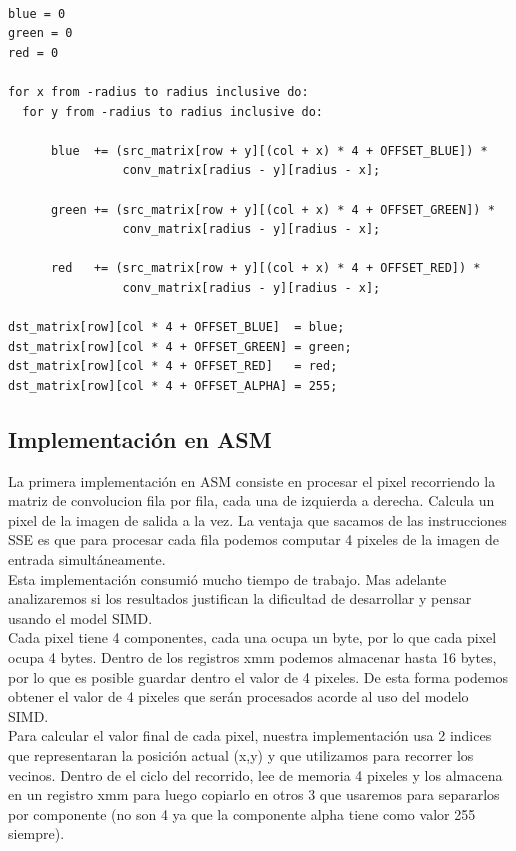 \documentclass[10pt,a4paper,spanish]{article}
\begin{document}
\begin{codesnippet}
\begin{verbatim}

blue = 0
green = 0
red = 0

for x from -radius to radius inclusive do:
  for y from -radius to radius inclusive do:

      blue  += (src_matrix[row + y][(col + x) * 4 + OFFSET_BLUE]) *
                conv_matrix[radius - y][radius - x];

      green += (src_matrix[row + y][(col + x) * 4 + OFFSET_GREEN]) *
                conv_matrix[radius - y][radius - x];

      red   += (src_matrix[row + y][(col + x) * 4 + OFFSET_RED]) *
                conv_matrix[radius - y][radius - x];

dst_matrix[row][col * 4 + OFFSET_BLUE]  = blue;
dst_matrix[row][col * 4 + OFFSET_GREEN] = green;
dst_matrix[row][col * 4 + OFFSET_RED]   = red;
dst_matrix[row][col * 4 + OFFSET_ALPHA] = 255;

\end{verbatim}
\end{codesnippet}

\subsection{Implementación en ASM}

La primera implementación en ASM consiste en procesar el pixel recorriendo la matriz de convolucion fila por fila, cada una de izquierda a derecha.
Calcula un pixel de la imagen de salida a la vez. La ventaja que sacamos de las instrucciones SSE es que para procesar cada fila podemos computar 4 pixeles de la imagen de entrada simultáneamente. \\

Esta implementación consumió mucho tiempo de trabajo. Mas adelante analizaremos si los resultados justifican la dificultad de desarrollar y pensar usando el model SIMD. \\

Cada pixel tiene 4 componentes, cada una ocupa un byte, por lo que cada pixel ocupa 4 bytes. Dentro de los registros xmm podemos almacenar hasta 16 bytes, por lo que es posible guardar dentro el valor de 4 pixeles. De esta forma podemos obtener el valor de 4 pixeles que serán procesados acorde al uso del modelo SIMD. \\

Para calcular el valor final de cada pixel, nuestra implementación usa 2 indices que representaran la posición actual (x,y) y que utilizamos para recorrer los vecinos. Dentro de el ciclo del recorrido, lee de memoria 4 pixeles y los almacena en un registro xmm para luego copiarlo en otros 3 que usaremos para separarlos por componente (no son 4 ya que la componente alpha tiene como valor 255 siempre).
\end{document}
